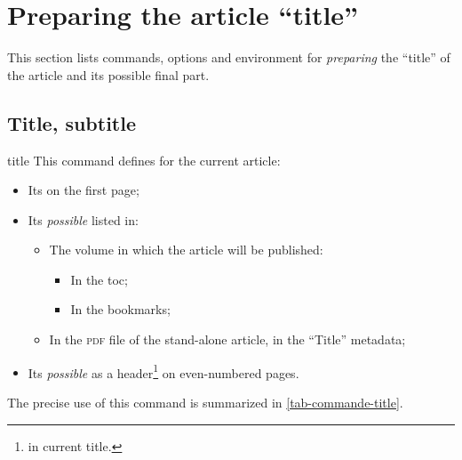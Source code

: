 \documentclass[english,nolocaltoc]{nwejmart}
\newtheorem[style=definition]{fact}
\newtheorem[title-plural=Criteria]{criterion}
\newtheorem[title=random experiment]{rexp}
\begin{document}
\section{Preparing the article  \enquote{title}}
\label{sec-prep-de-lart}

This section lists commands, options and environment for \emph{preparing} the \enquote{title} of the article and its possible final part.

\subsection{Title, subtitle}
\label{sec-title}

\begin{docCommand}[doc new=2017-10-23]{title}{}
  This command defines for the current article:
  \begin{itemize}
  \item Its  on the first page;
  \item Its \emph{possible}  listed in:
    \begin{itemize}
    \item The volume in which the article will be published:
      \begin{itemize}
      \item In the \gls{toc};
      \item In the bookmarks;
      \end{itemize}
    \item In the \textsc{pdf} file of the stand-alone article, in the \enquote{Title} metadata;
    \end{itemize}
  \item Its \emph{possible}  as a header\footnote{\Ie{} in current title.} on even-numbered pages.
  \end{itemize}
  The precise use of this command is summarized in \vref{tab-commande-title}.
\end{docCommand}
\end{document}
